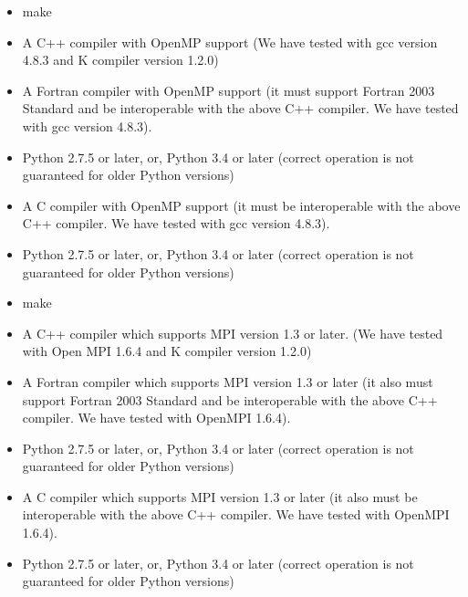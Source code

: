 \begin{itemize}
\item make
\item A C++ compiler with OpenMP support (We have tested with gcc version 4.8.3 and K compiler version 1.2.0)
\ifFtn %
\item A Fortran compiler with OpenMP support (it must support Fortran 2003 Standard and be interoperable with the above C++ compiler. We have tested with gcc version 4.8.3).
\item Python 2.7.5 or later, or, Python 3.4 or later (correct operation is not guaranteed for older Python versions)
\endifFtn
\ifC %
\item A C compiler with OpenMP support (it must be interoperable with the above C++ compiler. We have tested with gcc version 4.8.3).
\item Python 2.7.5 or later, or, Python 3.4 or later (correct operation is not guaranteed for older Python versions)
\endifC
\end{itemize}

\begin{itemize}
\item make
\item A C++ compiler which supports MPI version 1.3 or later. (We have
  tested with Open MPI 1.6.4 and K compiler version 1.2.0)
\ifFtn %
\item A Fortran compiler which supports MPI version 1.3 or later (it also must support Fortran 2003 Standard and be interoperable with the above C++ compiler. We have tested with OpenMPI 1.6.4).
\item Python 2.7.5 or later, or, Python 3.4 or later (correct operation is not guaranteed for older Python versions)
\endifFtn
\ifC %
\item A C compiler which supports MPI version 1.3 or later (it also must be interoperable with the above C++ compiler. We have tested with OpenMPI 1.6.4).
\item Python 2.7.5 or later, or, Python 3.4 or later (correct operation is not guaranteed for older Python versions)
\endifC
\end{itemize}

